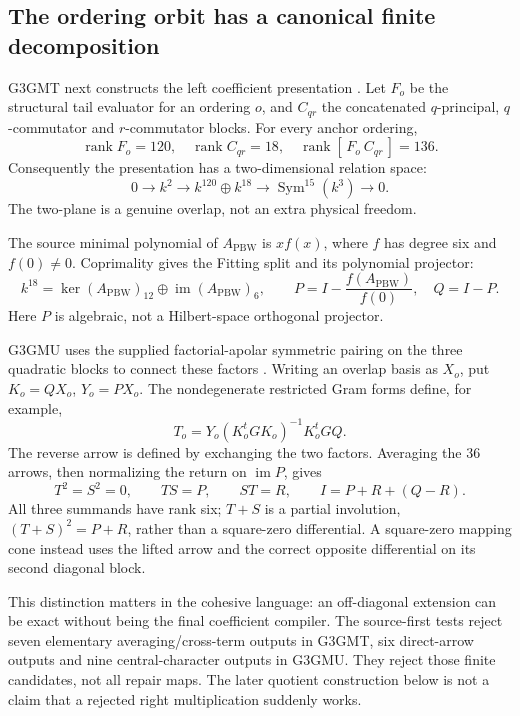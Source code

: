 \documentclass[11pt,a4paper]{article}
\begin{document}
\subsection{The ordering orbit has a canonical finite decomposition}
\label{sec:pbw-apolar-orbit}

G3GMT next constructs the left coefficient presentation
\cite{UnifiedCoefficientFitting2026}. Let \(F_o\) be the structural tail
evaluator for an ordering \(o\), and \(C_{qr}\) the concatenated
\(q\)-principal, \(q\)-commutator and \(r\)-commutator blocks.
For every anchor ordering,
\[
 \operatorname{rank}F_o=120,\quad
 \operatorname{rank}C_{qr}=18,\quad
 \operatorname{rank}[\,F_o\ C_{qr}\,]=136.
\]
Consequently the presentation has a two-dimensional relation space:
\[
 0\longrightarrow k^2\longrightarrow k^{120}\oplus k^{18}
 \longrightarrow \operatorname{Sym}^{15}(k^3)\longrightarrow0.
 \tag{P3}\label{eq:pbw-presentation}
\]
The two-plane is a genuine overlap, not an extra physical freedom.

The source minimal polynomial of \(A_{\mathrm{PBW}}\) is \(xf(x)\),
where \(f\) has degree six and \(f(0)\ne0\). Coprimality gives the
Fitting split and its polynomial projector:
\[
 k^{18}=\ker(A_{\mathrm{PBW}})_{12}\oplus
          \operatorname{im}(A_{\mathrm{PBW}})_6,\qquad
 P=I-\frac{f(A_{\mathrm{PBW}})}{f(0)},\quad Q=I-P.
 \tag{P4}\label{eq:pbw-fitting}
\]
Here \(P\) is algebraic, not a Hilbert-space orthogonal projector.

G3GMU uses the supplied factorial-apolar symmetric pairing on the three
quadratic blocks to connect these factors \cite{UnifiedApolarOrbit2026}.
Writing an overlap basis as \(X_o\), put \(K_o=QX_o\), \(Y_o=PX_o\).
The nondegenerate restricted Gram forms define, for example,
\[
 T_o=Y_o(K_o^tGK_o)^{-1}K_o^tGQ.
\]
The reverse arrow is defined by exchanging the two factors. Averaging the
36 arrows, then normalizing the return on \(\operatorname{im}P\), gives
\[
 T^2=S^2=0,\qquad TS=P,\qquad ST=R,\qquad
 I=P+R+(Q-R).
 \tag{P5}\label{eq:apolar-arrows}
\]
All three summands have rank six; \(T+S\) is a partial involution,
\((T+S)^2=P+R\), rather than a square-zero differential.
A square-zero mapping cone instead uses the lifted arrow and the
correct opposite differential on its second diagonal block.

This distinction matters in the cohesive language: an off-diagonal
extension can be exact without being the final coefficient compiler.
The source-first tests reject seven elementary averaging/cross-term
outputs in G3GMT, six direct-arrow outputs and nine central-character
outputs in G3GMU. They reject those finite candidates, not all repair maps.
The later quotient construction below is not a claim that a rejected
right multiplication suddenly works.
\end{document}

